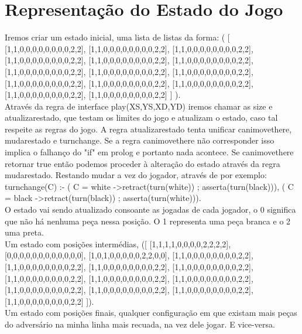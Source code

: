 \documentclass[a4paper]{article}
\begin{document}
\section{Representação do Estado do Jogo}
Iremos criar um estado inicial, uma lista de listas da forma:
( [ [1,1,0,0,0,0,0,0,0,0,2,2], [1,1,0,0,0,0,0,0,0,0,2,2], [1,1,0,0,0,0,0,0,0,0,2,2],
          [1,1,0,0,0,0,0,0,0,0,2,2], [1,1,0,0,0,0,0,0,0,0,2,2], [1,1,0,0,0,0,0,0,0,0,2,2],
          [1,1,0,0,0,0,0,0,0,0,2,2], [1,1,0,0,0,0,0,0,0,0,2,2], [1,1,0,0,0,0,0,0,0,0,2,2],
          [1,1,0,0,0,0,0,0,0,0,2,2], [1,1,0,0,0,0,0,0,0,0,2,2], [1,1,0,0,0,0,0,0,0,0,2,2],
          [1,1,0,0,0,0,0,0,0,0,2,2], [1,1,0,0,0,0,0,0,0,0,2,2] ] ).
\\\linebreak
Através da regra de interface play(XS,YS,XD,YD) iremos chamar as size e atualizarestado, que testam os limites do jogo e atualizam o estado, caso tal respeite as regras do jogo. A regra atualizarestado tenta unificar canimovethere, mudarestado e turnchange. Se a regra canimovethere não corresponder isso implica o falhanço do "if" em prolog e portanto nada acontece. Se canimovethere retornar true então podemos proceder à alteração do estado através da regra mudarestado. Restando mudar a vez do jogador, através de por exemplo:
\\\linebreak
turnchange(C) :-
  ( C = white -\textgreater retract(turn(white)) ; asserta(turn(black))),
  ( C = black -\textgreater retract(turn(black)) ; asserta(turn(white))).
\\\linebreak
O estado vai sendo atualizado consoante as jogadas de cada jogador, o 0 significa que não há nenhuma peça nessa posição. O 1 representa uma peça branca e o 2 uma preta.
\\\linebreak Um estado com posições intermédias, ([ [1,1,1,1,0,0,0,0,2,2,2,2], [0,0,0,0,0,0,0,0,0,0,0,0], [1,0,1,0,0,0,0,0,2,2,0,0],
          [1,1,0,0,0,0,0,0,0,0,2,2], [1,1,0,0,0,0,0,0,0,0,2,2], [1,1,0,0,0,0,0,0,0,0,2,2],
          [1,1,0,0,0,0,0,0,0,0,2,2], [1,1,0,0,0,0,0,0,0,0,2,2], [1,1,0,0,0,0,0,0,0,0,2,2],
          [1,1,0,0,0,0,0,0,0,0,2,2], [1,1,0,0,0,0,0,0,0,0,2,2], [1,1,0,0,0,0,0,0,0,0,2,2],
        [1,1,0,0,0,0,0,0,0,0,2,2], [1,1,0,0,0,0,0,0,0,0,2,2] ]).
\\\linebreak
Um estado com posições finais, qualquer configuração em que existam mais peças do adversário na minha linha mais recuada, na vez dele jogar. E vice-versa.
\end{document}

